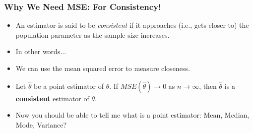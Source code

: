 \documentclass[12pt]{beamer}
\begin{document}
\begin{frame}
	\frametitle{Why We Need MSE: For Consistency!}
	
	\begin{itemize}[label={\color{blue}$\blacktriangleright$}]
		\item An estimator is said to be \emph{consistent} if it approaches (i.e., gets closer to) the population parameter as the sample size increases.
		\item In other words...
		
		\item We can use the mean squared error to measure closeness.
		
		\item Let $\hat{\theta}$ be a point estimator of $\theta$. If $MSE(\hat{\theta}) \to 0$ as $n \to \infty$, then $\hat{\theta}$ is a \textbf{consistent} estimator of $\theta$.
		\vspace{0.5cm}
		\item Now you should be able to tell me what is a point estimator: Mean, Median, Mode, Variance?
	\end{itemize}
	
\end{frame}
\end{document}
